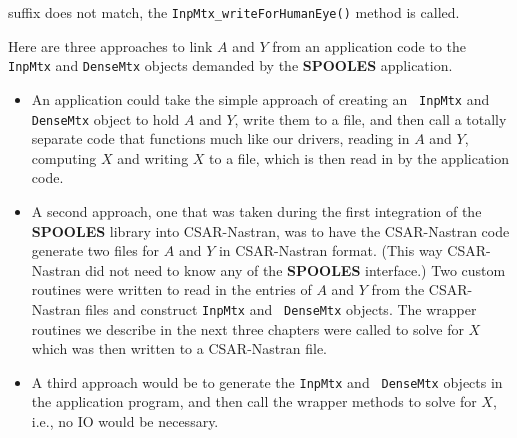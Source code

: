 suffix does not match, the {\tt InpMtx\_writeForHumanEye()} method
is called.
\par
Here are three approaches to link $A$ and $Y$ from an application
code to the {\tt InpMtx} and {\tt DenseMtx} objects demanded by the
{\bf SPOOLES} application.
\begin{itemize}
\item
An application could take the simple approach of creating an {\tt
InpMtx} and {\tt DenseMtx} object to hold $A$ and $Y$, write them
to a file, and then call a totally separate code that functions
much like our drivers, reading in $A$ and $Y$, computing $X$ and
writing $X$ to a file, which is then read in by the application code.
\item
A second approach, one that was taken during the first integration 
of the {\bf SPOOLES} library into CSAR-Nastran, was to have the
CSAR-Nastran code generate two files for $A$ and $Y$ in CSAR-Nastran 
format.
(This way CSAR-Nastran did not need to know any of the {\bf SPOOLES}
interface.)
Two custom routines were written to read in the entries of $A$ and 
$Y$ from the CSAR-Nastran files and construct {\tt InpMtx} and {\tt
DenseMtx} objects.
The wrapper routines we describe in the next three chapters were
called to solve for $X$ which was then written to a CSAR-Nastran file.
\item
A third approach would be to generate the {\tt InpMtx} and {\tt
DenseMtx} objects in the application program, and then call the
wrapper methods to solve for $X$, i.e., no IO would be necessary.
\end{itemize}
